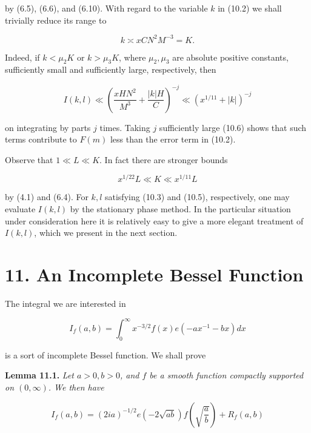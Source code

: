 \documentclass[10pt]{article}
\begin{document}
by (6.5), (6.6), and (6.10). With regard to the variable $k$ in (10.2) we shall trivially reduce its range to


\begin{equation*}
k \asymp x C N^{2} M^{-3}=K . \tag{10.5}
\end{equation*}


Indeed, if $k<\mu_{2} K$ or $k>\mu_{3} K$, where $\mu_{2}, \mu_{3}$ are absolute positive constants, sufficiently small and sufficiently large, respectively, then


\begin{equation*}
I(k,l)\ll\left(\frac{xHN^{2}}{M^{3}}+\frac{|k|H}{C}\right)^{-j}\ll\left(x^{1/11}+|k|\right)^{-j} \tag{10.6}
\end{equation*}


on integrating by parts $j$ times. Taking $j$ sufficiently large (10.6) shows that such terms contribute to $F(m)$ less than the error term in (10.2).

Observe that $1\ll L\ll K$. In fact there are stronger bounds


\begin{equation*}
x^{1 / 22} L \ll K \ll x^{1 / 11} L \tag{10.7}
\end{equation*}


by (4.1) and (6.4). For $k, l$ satisfying (10.3) and (10.5), respectively, one may evaluate $I(k, l)$ by the stationary phase method. In the particular situation under consideration here it is relatively easy to give a more elegant treatment of $I(k, l)$, which we present in the next section.

\section*{11. An Incomplete Bessel Function}
The integral we are interested in


\begin{equation*}
I_{f}(a, b)=\int_{0}^{\infty} x^{-3 / 2} f(x) e\left(-a x^{-1}-b x\right) d x \tag{11.1}
\end{equation*}


is a sort of incomplete Bessel function. We shall prove

\medskip\noindent\textbf{Lemma 11.1.} \textit{Let $a>0, b>0$, and $f$ be a smooth function compactly supported on $(0, \infty)$. We then have}

\begin{equation*}
I_{f}(a, b)=(2 i a)^{-1 / 2} e(-2 \sqrt{a b}) f\left(\sqrt{\frac{a}{b}}\right)+R_{f}(a, b) \tag{11.2}
\end{equation*}
\end{document}
